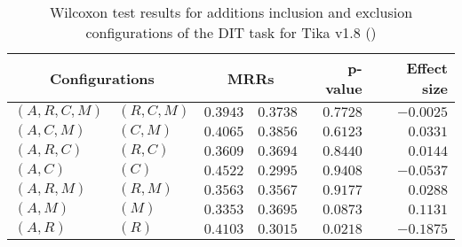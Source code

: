 
\begin{table}
\begin{spacing}{1.2}
\centering
\caption{Wilcoxon test results for additions inclusion and exclusion configurations of the DIT task for Tika v1.8 (\ctwo)}
\label{table:versus-wilcox-tika-dit-additions}
\begin{tabular}{ll|rr|rr}
\toprule
      \multicolumn{2}{c|}{Configurations} &                \multicolumn{2}{c|}{MRRs} &             p-value & Effect size \\
\midrule
 $(A,R,C,M)$ &  $(R,C,M)$ &  $\bm{0.3943}$ &       $0.3738$ & $0.7728$ &   $-0.0025$ \\
   $(A,C,M)$ &    $(C,M)$ &  $\bm{0.4065}$ &       $0.3856$ & $0.6123$ &    $0.0331$ \\
   $(A,R,C)$ &    $(R,C)$ &       $0.3609$ &  $\bm{0.3694}$ & $0.8440$ &    $0.0144$ \\
     $(A,C)$ &      $(C)$ &  $\bm{0.4522}$ &       $0.2995$ & $0.9408$ &   $-0.0537$ \\
   $(A,R,M)$ &    $(R,M)$ &       $0.3563$ &  $\bm{0.3567}$ & $0.9177$ &    $0.0288$ \\
     $(A,M)$ &      $(M)$ &       $0.3353$ &  $\bm{0.3695}$ & $0.0873$ &    $0.1131$ \\
     $(A,R)$ &      $(R)$ &  $\bm{0.4103}$ &       $0.3015$ & $0.0218$ &   $-0.1875$ \\
\bottomrule
\end{tabular}

\end{spacing}
\end{table}

